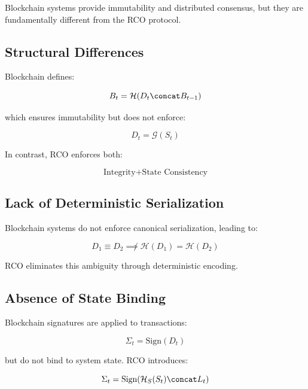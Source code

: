 Blockchain systems provide immutability and distributed consensus, but they are fundamentally different from the RCO protocol.

\subsection{Structural Differences}

Blockchain defines:

\begin{equation}
B_t = \mathcal{H}(D_t \concat B_{t-1})
\end{equation}

which ensures immutability but does not enforce:

\begin{equation}
D_t = \mathcal{G}(S_t)
\end{equation}

In contrast, RCO enforces both:

\begin{equation}
\text{Integrity} + \text{State Consistency}
\end{equation}

\subsection{Lack of Deterministic Serialization}

Blockchain systems do not enforce canonical serialization, leading to:

\begin{equation}
D_1 \equiv D_2 \not\implies \mathcal{H}(D_1) = \mathcal{H}(D_2)
\end{equation}

RCO eliminates this ambiguity through deterministic encoding.

\subsection{Absence of State Binding}

Blockchain signatures are applied to transactions:

\begin{equation}
\Sigma_t = \text{Sign}(D_t)
\end{equation}

but do not bind to system state. RCO introduces:

\begin{equation}
\Sigma_t = \text{Sign}(\mathcal{H}_S(S_t) \concat L_t)
\end{equation}

